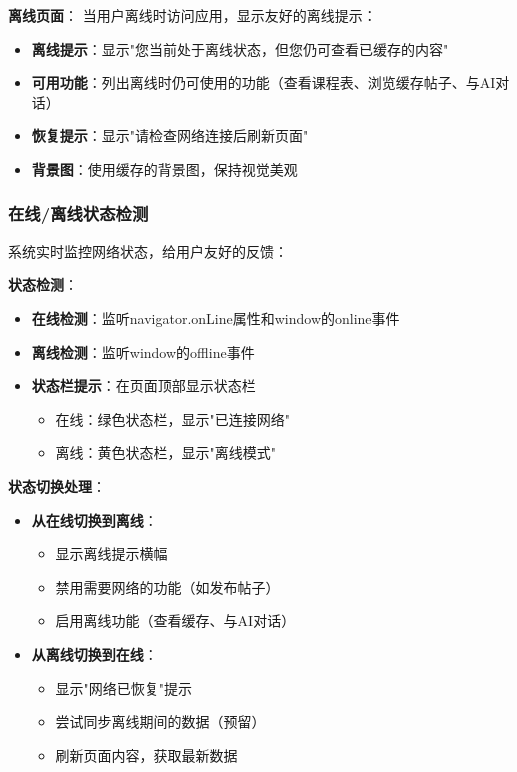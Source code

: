 \documentclass[12pt,a4paper]{article}
\begin{document}
\textbf{离线页面}：
当用户离线时访问应用，显示友好的离线提示：

\begin{itemize}
    \item \textbf{离线提示}：显示"您当前处于离线状态，但您仍可查看已缓存的内容"
    \item \textbf{可用功能}：列出离线时仍可使用的功能（查看课程表、浏览缓存帖子、与AI对话）
    \item \textbf{恢复提示}：显示"请检查网络连接后刷新页面"
    \item \textbf{背景图}：使用缓存的背景图，保持视觉美观
\end{itemize}

\subsubsection{在线/离线状态检测}

系统实时监控网络状态，给用户友好的反馈：

\textbf{状态检测}：
\begin{itemize}
    \item \textbf{在线检测}：监听navigator.onLine属性和window的online事件
    \item \textbf{离线检测}：监听window的offline事件
    \item \textbf{状态栏提示}：在页面顶部显示状态栏
        \begin{itemize}
            \item 在线：绿色状态栏，显示"已连接网络"
            \item 离线：黄色状态栏，显示"离线模式"
        \end{itemize}
\end{itemize}

\textbf{状态切换处理}：
\begin{itemize}
    \item \textbf{从在线切换到离线}：
        \begin{itemize}
            \item 显示离线提示横幅
            \item 禁用需要网络的功能（如发布帖子）
            \item 启用离线功能（查看缓存、与AI对话）
        \end{itemize}
    \item \textbf{从离线切换到在线}：
        \begin{itemize}
            \item 显示"网络已恢复"提示
            \item 尝试同步离线期间的数据（预留）
            \item 刷新页面内容，获取最新数据
        \end{itemize}
\end{itemize}
\end{document}
